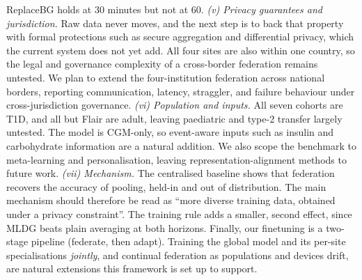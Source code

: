 \documentclass[10pt,letterpaper]{article}
\begin{document}
ReplaceBG holds at 30 minutes but not at 60.
\emph{(v) Privacy guarantees and jurisdiction.} Raw data never moves, and the
next step is to back that property with formal protections such as secure
aggregation and differential privacy, which the current system does not yet
add. All four sites are also within one country, so the legal and governance
complexity of a cross-border federation remains untested. We plan to extend the
four-institution federation across national borders, reporting communication,
latency, straggler, and failure behaviour under cross-jurisdiction governance.
\emph{(vi) Population and inputs.} All seven cohorts are T1D, and all but
Flair are adult, leaving paediatric and type-2 transfer largely untested. The model is CGM-only, so event-aware
inputs such as insulin and carbohydrate information are a natural addition. We
also scope the benchmark to meta-learning and personalisation, leaving
representation-alignment methods to future work.
\emph{(vii) Mechanism.} The centralised baseline shows that federation
recovers the accuracy of pooling, held-in and out of distribution. The main
mechanism should therefore be read as ``more diverse training data, obtained
under a privacy constraint''. The training rule adds a smaller, second
effect, since MLDG beats plain averaging at both horizons.
Finally, our finetuning is a two-stage pipeline (federate, then adapt).
Training the global model and its per-site specialisations \emph{jointly}, and
continual federation as populations and devices drift, are natural extensions
this framework is set up to support.



\end{document}
